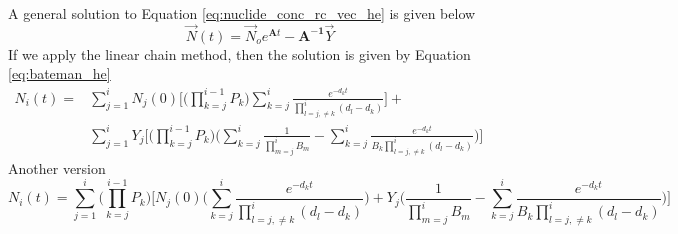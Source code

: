 A general solution to Equation \ref{eq:nuclide_conc_rc_vec_he} is given below
\begin{equation}\label{eq:rate_change_sol_he}
  \vec{N}(t) =\vec{N}_{o} e^{\boldsymbol{A}t }- \boldsymbol{A^{-1}} \vec{Y}
\end{equation}
If we apply the linear chain method, then the solution is given by Equation
\ref{eq:bateman_he}
\begin{equation}\label{eq:bateman_he}
  \begin{aligned}
  N_{i}(t) = &\sum_{j=1}^{i} N_{j}(0)
  \Bigg[ \Bigg( \prod_{k=j}^{i-1} P_{k} \Bigg)
  \sum_{k=j}^{i}\frac{e^{-d_{k}t}}{\displaystyle \prod_{l=j, \neq k}^{i}
  (d_{l} -d_{k})}
  \Bigg] + &&\\
  &\sum_{j=1}^{i} Y_{j} \Bigg[ \Bigg(\prod_{k=j}^{i-1} P_{k} \Bigg)
  \Bigg(\sum_{k=j}^{i} \frac{1}{\displaystyle \prod_{m=j}^{i} B_{m}} -
  \sum_{k=j}^{i} \frac{e^{-d_{k}t}}{B_{k} \displaystyle \prod_{l=j, \neq k}^{i}(d_{l} -d_{k})}
  \Bigg)\Bigg]
  \end{aligned}
\end{equation}
Another version
\begin{equation}\label{eq:bateman_he_2}
  N_{i}(t) = \sum_{j=1}^{i}
  \Bigg( \prod_{k=j}^{i-1} P_{k} \Bigg)
  \Bigg[ N_{j}(0) \Bigg(\sum_{k=j}^{i}\frac{e^{-d_{k}t}}{\displaystyle
  \prod_{l=j, \neq k}^{i}(d_{l} -d_{k})}
  \Bigg) + Y_{j}
  \Bigg( \frac{1}{\displaystyle \prod_{m=j}^{i} B_{m}} -
  \sum_{k=j}^{i} \frac{e^{-d_{k}t}}{B_{k}
  \prod_{\displaystyle l=j, \neq k}^{i}(d_{l} -d_{k})}
  \Bigg)\Bigg]
\end{equation}
